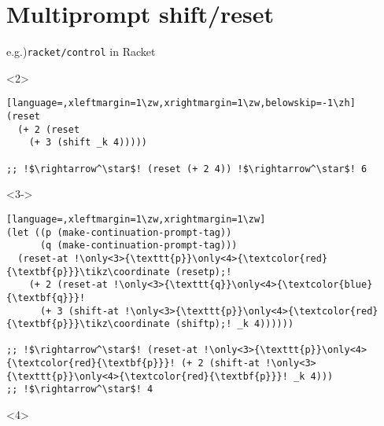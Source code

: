 \section{Multiprompt shift/reset}
\begin{frame}[t,fragile]
  \frametitlesec

  \pause
  e.g.)\texttt{racket/control} in Racket

  \begin{onlyenv}<2>
    \begin{lstlisting}[language=,xleftmargin=1\zw,xrightmargin=1\zw,belowskip=-1\zh]
(reset
  (+ 2 (reset
    (+ 3 (shift _k 4)))))

;; !$\rightarrow^\star$! (reset (+ 2 4)) !$\rightarrow^\star$! 6
    \end{lstlisting}
  \end{onlyenv}
  \begin{onlyenv}<3->
    \begin{lstlisting}[language=,xleftmargin=1\zw,xrightmargin=1\zw]
(let ((p (make-continuation-prompt-tag))
      (q (make-continuation-prompt-tag)))
  (reset-at !\only<3>{\texttt{p}}\only<4>{\textcolor{red}{\textbf{p}}}\tikz\coordinate (resetp);!
    (+ 2 (reset-at !\only<3>{\texttt{q}}\only<4>{\textcolor{blue}{\textbf{q}}}!
      (+ 3 (shift-at !\only<3>{\texttt{p}}\only<4>{\textcolor{red}{\textbf{p}}}\tikz\coordinate (shiftp);! _k 4))))))

;; !$\rightarrow^\star$! (reset-at !\only<3>{\texttt{p}}\only<4>{\textcolor{red}{\textbf{p}}}! (+ 2 (shift-at !\only<3>{\texttt{p}}\only<4>{\textcolor{red}{\textbf{p}}}! _k 4)))
;; !$\rightarrow^\star$! 4
    \end{lstlisting}
  \end{onlyenv}
  \begin{onlyenv}<4>
  \end{onlyenv}
\end{frame}

